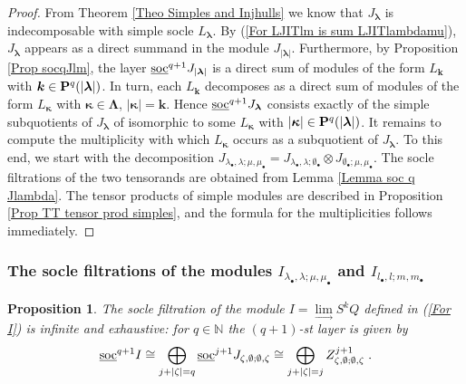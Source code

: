 \documentclass[12pt]{article}
\def\NN {{\mathbb N}}     %
\def\ul  {\underline}
\newtheorem{prop}[theorem]{Proposition}
\begin{document}
\begin{proof}
From Theorem \ref{Theo Simples and Injhulls} we know that $J_{\bm\lambda}$ is indecomposable with simple socle $L_{\bm\lambda}$. By (\ref{For LJITlm is sum LJITlambdamu}), $J_{\bm\lambda}$ appears as a direct summand in the module $J_{|\bm\lambda|}$. Furthermore, by Proposition \ref{Prop socqJlm}, the layer $\ul{\rm soc}^{q+1}J_{|\bm\lambda|}$ is a direct sum of modules of the form $L_{\bm k}$ with $\bm k\in {\bf P}^q(|\bm\lambda|)$. In turn, each $L_{\bm k}$ decomposes as a direct sum of modules of the form $L_{\bm\kappa}$ with $\bm\kappa\in\bm\Lambda$, $|\bm\kappa|=\bm k$. Hence $\ul{\rm soc}^{q+1}J_{\bm\lambda}$ consists exactly of the simple subquotients of $J_{\bm\lambda}$ of isomorphic to some $L_{\bm\kappa}$ with $|\bm\kappa|\in{\bf P}^q(|\bm\lambda|)$. It remains to compute the multiplicity with which $L_{\bm\kappa}$ occurs as a subquotient of $J_{\bm\lambda}$. To this end, we start with the decomposition $J_{\lambda_\bullet,\lambda;\mu,\mu_\bullet}=J_{\lambda_\bullet,\lambda;\emptyset_\bullet}\otimes J_{\emptyset_\bullet;\mu,\mu_\bullet}$. The socle filtrations of the two tensorands are obtained from Lemma \ref{Lemma soc q Jlambda}. The tensor products of simple modules are described in Proposition \ref{Prop TT tensor prod simples}, and the formula for the multiplicities follows immediately.
\end{proof}


\subsubsection{The socle filtrations of the modules $I_{\lambda_\bullet,\lambda;\mu,\mu_\bullet}$ and $I_{l_\bullet,l;m,m_\bullet}$}\label{Sec Ilm Ilambdamu}

\begin{prop}\label{Prop soc q I}
The socle filtration of the module $I=\lim\limits_\to S^kQ$ defined in (\ref{For I}) is infinite and exhaustive: for $q\in\NN$ the $(q+1)$-st layer is given by
$$
\ul{\rm soc}^{q+1}I \cong \bigoplus\limits_{j+|\zeta|=q} \ul{\rm soc}^{j+1}J_{\zeta,\emptyset;\emptyset,\zeta} \cong \bigoplus\limits_{j+|\zeta|=j} Z^{j+1}_{\zeta,\emptyset;\emptyset,\zeta} \;.
$$
\end{prop}
\end{document}
